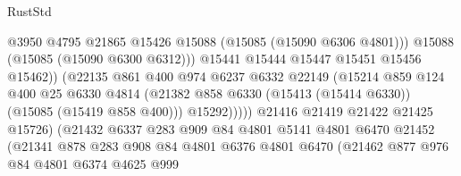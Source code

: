 \begin{lexlean}{RustStd}
\begin{coremodule}
                                        @3950
                                        @4795
                                        @21865
                                        @15426
                                        @15088
                                        (@15085 (@15090 @6306 @4801)))
                                      @15088
                                      (@15085 (@15090 @6300 @6312)))
                                    @15441
                                    @15444
                                    @15447
                                    @15451
                                    @15456
                                    @15462))
                                (@22135
                                  @861
                                  @400
                                  @974
                                  @6237
                                  @6332
                                  @22149
                                  (@15214
                                    @859
                                    @124
                                    @400
                                    @25
                                    @6330
                                    @4814
                                    (@21382
                                      @858
                                      @6330
                                      (@15413 (@15414 @6330))
                                      (@15085 (@15419 @858 @400)))
                                    @15292)))))
                          @21416
                          @21419
                          @21422
                          @21425
                          @15726)
                        (@21432
                          @6337
                          @283
                          @909
                          @84
                          @4801
                          @5141
                          @4801
                          @6470
                          @21452
                          (@21341
                            @878
                            @283
                            @908
                            @84
                            @4801
                            @6376
                            @4801
                            @6470
                            (@21462
                              @877
                              @976
                              @84
                              @4801
                              @6374
                              @4625
                              @999

\end{coremodule}
\end{lexlean}
